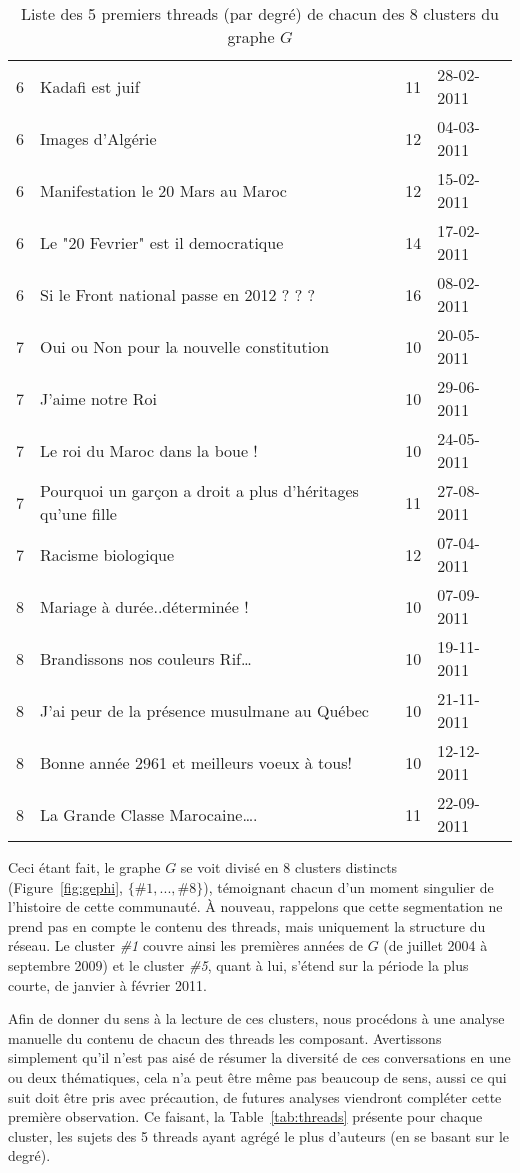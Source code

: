 \documentclass[symmetric,justified,marginals=raggedouter]{tufte-book}
\begin{document}
\begin{table*}
\begin{tabular}{clcl}
    \midrule 
	6&Kadafi est juif&11&28-02-2011\\
	6&Images d'Algérie&12&04-03-2011\\
	6&Manifestation le 20 Mars au Maroc&12&15-02-2011\\
	6&Le "20 Fevrier" est il democratique&14&17-02-2011\\
	6&Si le Front national passe en 2012 ? ? ?&16&08-02-2011\\
    \midrule 	
	7&Oui ou Non pour la nouvelle constitution&10&20-05-2011\\
	7&J'aime notre Roi&10&29-06-2011\\
	7&Le roi du Maroc dans la boue !&10&24-05-2011\\
	7&Pourquoi un garçon a droit a plus d'héritages qu'une fille&11&27-08-2011\\
	7&Racisme biologique&12&07-04-2011\\
    \midrule 	
	8&Mariage à durée..déterminée !&10&07-09-2011\\
	8&Brandissons nos couleurs Rif\ldots{}&10&19-11-2011\\
	8&J'ai peur de la présence musulmane au Québec&10&21-11-2011\\
	8&Bonne année 2961 et meilleurs voeux à tous!&10&12-12-2011\\
	8&La Grande Classe Marocaine\ldots{}.&11&22-09-2011\\  
  \bottomrule
  \end{tabular}
  \bigskip
  \caption{Liste des 5 premiers threads (par degré) de chacun des 8 clusters du graphe $G$}
\end{table*}

Ceci étant fait, le graphe $G$ se voit divisé en 8 clusters distincts (Figure~\ref{fig:gephi}, $\{\#1,...,\#8\}$), témoignant chacun d'un moment singulier de l'histoire de cette communauté. À nouveau, rappelons que cette segmentation ne prend pas en compte le contenu des threads, mais uniquement la structure du réseau. Le cluster \textit{\#1} couvre ainsi les premières années de $G$ (de juillet 2004 à septembre 2009) et le cluster \textit{\#5}, quant à lui, s'étend sur la période la plus courte, de janvier à février 2011. 

Afin de donner du sens à la lecture de ces clusters, nous procédons à une analyse manuelle du contenu de chacun des threads les composant. Avertissons simplement qu'il n'est pas aisé de résumer la diversité de ces conversations en une ou deux thématiques, cela n'a peut être même pas beaucoup de sens, aussi ce qui suit doit être pris avec précaution, de futures analyses viendront compléter cette première observation. Ce faisant, la Table~\ref{tab:threads} présente pour chaque cluster, les sujets des 5 threads ayant agrégé le plus d'auteurs (en se basant sur le degré).
\end{document}
